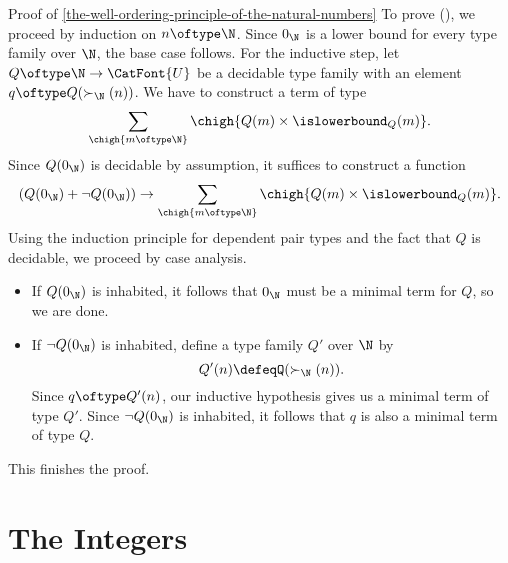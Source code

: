 \begin{Proof}{Proof of \cref{the-well-ordering-principle-of-the-natural-numbers}}
    \indent To prove (\star), we proceed by induction on $n\oftype\N$. Since $0_{\N}$ is a lower bound for every type family over $\N$, the base case follows. For the inductive step, let $Q\oftype\N\to\CatFont{U}$ be a decidable type family with an element $q\oftype Q(\succ_{\N}(n))$. We have to construct a term of type
    \[
        \sum_{\chigh{m\oftype\N}}\chigh{Q(m)\times\islowerbound_{Q}(m)}.%
    \]%
    Since $Q(0_{\N})$ is decidable by assumption, it suffices to construct a function
    \[
        (Q(0_{\N})+\neg Q(0_{\N}))%
        \to%
        \sum_{\chigh{m\oftype\N}}\chigh{Q(m)\times\islowerbound_{Q}(m)}.%
    \]%
    Using the induction principle for dependent pair types and the fact that $Q$ is decidable, we proceed by case analysis.
    \begin{itemize}
        \item If $Q(0_{\N})$ is inhabited, it follows that $0_{\N}$ must be a minimal term for $Q$, so we are done.
        \item If $\neg Q(0_{\N})$ is inhabited, define a type family $Q'$ over $\N$ by
            \[
                Q'(n)%
                \defeq%
                Q(\succ_{\N}(n)).%
            \]%
            Since $q\oftype Q'(n)$, our inductive hypothesis gives us a minimal term of type $Q'$. Since $\neg Q(0_{\N})$ is inhabited, it follows that $q$ is also a minimal term of type $Q$.
    \end{itemize}
    This finishes the proof.
\end{Proof}
\section{The Integers}\label{section-martin-löf-type-theory-the-integers}
